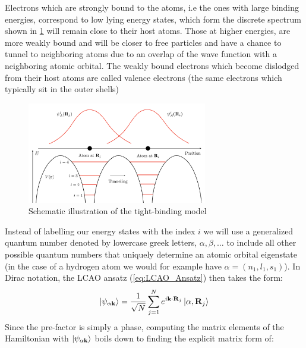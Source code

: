 \documentclass[11pt, a4paper, oneside]{book}
\theoremstyle{definition} %
\begin{document}
Electrons which are strongly bound to the atoms, i.e the ones with large binding energies, correspond to low lying energy states, which form the discrete spectrum shown in \ref{fig:illustration_tightbinding} will remain close to their host atoms. Those at higher energies, are more weakly bound and will be closer to free particles and have a chance to tunnel to neighboring atoms due to an overlap of the wave function with a neighboring atomic orbital. The weakly bound electrons which become dislodged from their host atoms are called valence electrons (the same electrons which typically sit in the outer shells) \cite{Singleton}\cite{Simon}\cite{Girvin}
\begin{figure}[h]
	\centering
	\includegraphics[width = 0.7\textwidth]{TightBindingModel-Illustration}
	\caption{Schematic illustration of the tight-binding model}
	\label{fig:illustration_tightbinding}
\end{figure}
Instead of labelling our energy states with the index $i$ we will use a generalized quantum number denoted by lowercase greek letters, $\alpha, \beta, \dots$ to include all other possible quantum numbers that uniquely determine an atomic orbital eigenstate (in the case of a hydrogen atom we would for example have $\alpha = (n_1,l_1,s_1)$). In Dirac notation, the LCAO ansatz (\ref{eq:LCAO_Ansatz}) then takes the form:
\begin{equation}
	\ket{\psi_{\alpha\mathbf{k}}} = \frac{1}{\sqrt{N}} \sum_{j=1}^N e^{i \mathbf{k} \cdot \mathbf{R}_j} \ket{\alpha, \mathbf{R}_j}
	\label{eq:LCAO_ansatz}
\end{equation}
Since the pre-factor is simply a phase, computing the matrix elements of the Hamiltonian with $\ket{\psi_{\alpha \mathbf{k}}}$ boils down to finding the explicit matrix form of: 
\end{document}
